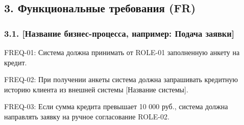 \documentclass[10pt,a4paper]{article}
\begin{document}
\begin{landscape}

\subsection{3. Функциональные требования (FR)}\label{3-ux444ux443ux43dux43aux446ux438ux43eux43dux430ux43bux44cux43dux44bux435-ux442ux440ux435ux431ux43eux432ux430ux43dux438ux44f-fr}

\subsubsection{3.1. {[}Название бизнес-процесса, например: Подача заявки{]}}\label{31-ux43dux430ux437ux432ux430ux43dux438ux435-ux431ux438ux437ux43dux435ux441-ux43fux440ux43eux446ux435ux441ux441ux430-ux43dux430ux43fux440ux438ux43cux435ux440-ux43fux43eux434ux430ux447ux430-ux437ux430ux44fux432ux43aux438}

FREQ-01: Система должна принимать от ROLE-01 заполненную анкету на кредит.

FREQ-02: При получении анкеты система должна запрашивать кредитную историю клиента из внешней системы {[}Название системы{]}.

FREQ-03: Если сумма кредита превышает 10 000 руб., система должна направлять заявку на ручное согласование ROLE-02.


\end{landscape}
\end{document}
